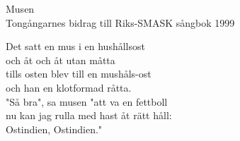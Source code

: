   {\Large Musen}\\{\tiny  Tongångarnes bidrag till Riks-SMASK sångbok 1999}
  \begin{vers}
Det satt en mus i en hushållsost \\
och åt och åt utan måtta \\
tills osten blev till en mushåls-ost \\
och han en klotformad råtta. \\
"Så bra", sa musen "att va en fettboll \\
nu kan jag rulla med hast åt rätt håll:\\ 
Ostindien, Ostindien."\\ 
\end{vers}